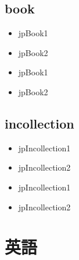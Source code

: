 \documentclass[10pt, a4paper]{jsarticle}
\newcommand{\putlst}[1]{
  \noindent\makebox[\linewidth]{\rule{\linewidth}{0.4pt}}\vspace{-1.5zw}
  \vspace{-1.8zw}
  \noindent\makebox[\linewidth]{\rule{\linewidth}{0.4pt}}\vspace{0.5zw}\par
}
\begin{document}
\subsection{book}

\putlst{bib/jpbook.bib}

\begin{bibunit}[IEEJtran]
  \begin{itemize}
    \item jpBook1 \cite{jpBook1}
    \item jpBook2 \cite{jpBook2}
  \end{itemize}
  {\small {}}
\end{bibunit}
\begin{bibunit}[jIEEEtran]
  \begin{itemize}
    \item jpBook1 \cite{jpBook1}
    \item jpBook2 \cite{jpBook2}
  \end{itemize}
  {\small {}}
\end{bibunit}


\subsection{incollection}

\putlst{bib/jpincollection.bib}

\begin{bibunit}[IEEJtran]
  \begin{itemize}
    \item jpIncollection1 \cite{jpIncollection1}
    \item jpIncollection2 \cite{jpIncollection2}
  \end{itemize}
  {\small {}}
\end{bibunit}
\begin{bibunit}[jIEEEtran]
  \begin{itemize}
    \item jpIncollection1 \cite{jpIncollection1}
    \item jpIncollection2 \cite{jpIncollection2}
  \end{itemize}
  {\small {}}
\end{bibunit}

\clearpage
\section{英語}
\end{document}
